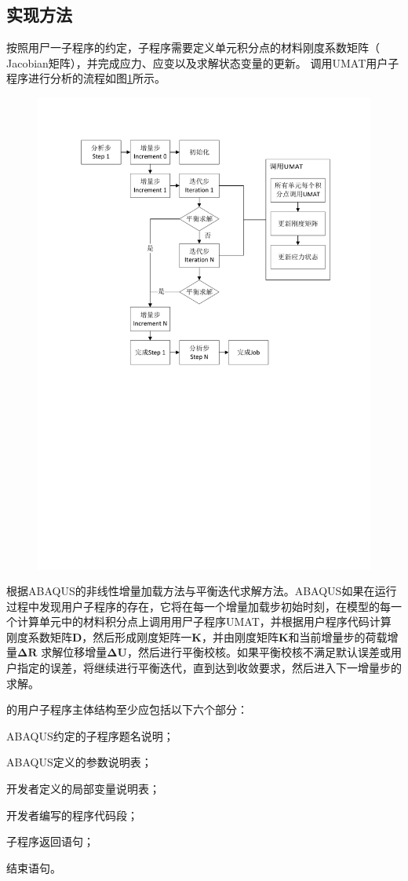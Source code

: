 \subsection{\uma 实现方法}

按照\aba 用尸一子程序的约定，\uma 子程序需要定义单元积分点的材料刚度系数矩阵（ Jacobian矩阵），并完成应力、应变以及求解状态变量的更新。
调用UMAT用户子程序进行分析的流程如图\ref{fig:umat-diaoyong}所示。
\begin{figure}[!htp]
	\centering
	\includegraphics[width=0.7\linewidth]{figure/chap3/umat-diaoyong}
	\label{fig:umat-diaoyong}
\end{figure}


根据ABAQUS的非线性增量加载方法与平衡迭代求解方法。ABAQUS如果在运行过程中发现用户子程序\uma 的存在，它将在每一个增量加载步初始时刻，在模型的每一个计算单元中的材料积分点上调用用尸子程序UMAT，并根据用户程序代码计算刚度系数矩阵$ \bm{D} $，然后形成刚度矩阵一$ \bm{K} $，并由刚度矩阵$ \bm{K} $和当前增量步的荷载增量$ \bm{\Delta R} $ 求解位移增量$ \bm{\Delta U} $，然后进行平衡校核。如果平衡校核不满足默认误差或用户指定的误差，\aba 将继续进行平衡迭代，直到达到收敛要求，然后进入下一增量步的求解。

\aba 的用户子程序主体结构至少应包括以下六个部分：
\begin{inparaenum}[(1)]
\item ABAQUS约定的子程序题名说明；
\item  ABAQUS定义的参数说明表；
\item 开发者定义的局部变量说明表；
\item 开发者编写的程序代码段；
\item 子程序返回语句；
\item 结束语句。
\end{inparaenum}   


